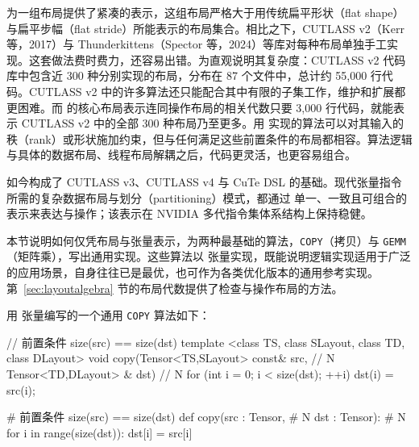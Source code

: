 \label{sec:algorithms}

\CuTe 为一组布局提供了紧凑的表示，这组布局严格大于用传统扁平形状（flat shape）与扁平步幅（flat stride）所能表示的布局集合。相比之下，CUTLASS v2（Kerr 等，2017）与 Thunderkittens（Spector 等，2024）等库对每种布局单独手工实现。这套做法费时费力，还容易出错。为直观说明其复杂度：CUTLASS v2 代码库中包含近 300 种分别实现的布局，分布在 87 个文件中，总计约 55,000 行代码。CUTLASS v2 中的许多算法还只能配合其中有限的子集工作，维护和扩展都更困难。而 \CuTe 的核心布局表示连同操作布局的相关代数只要 3,000 行代码，就能表示 CUTLASS v2 中的全部 300 种布局乃至更多。用 \CuTe 实现的算法可以对其输入的秩（rank）或形状施加约束，但与任何满足这些前置条件的布局都相容。算法逻辑与具体的数据布局、线程布局解耦之后，代码更灵活，也更容易组合。

\CuTe 如今构成了 CUTLASS v3、CUTLASS v4 与 CuTe DSL 的基础。现代张量指令所需的复杂数据布局与划分（partitioning）模式，都通过 \CuTe 单一、一致且可组合的表示来表达与操作；该表示在 NVIDIA 多代指令集体系结构上保持稳健。

本节说明如何仅凭布局与张量表示，为两种最基础的算法，{\tt COPY}（拷贝）与 {\tt GEMM}（矩阵乘），写出通用实现。这些算法以 \CuTe 张量实现，既能说明逻辑实现适用于广泛的应用场景，自身往往已是最优，也可作为各类优化版本的通用参考实现。第~\ref{sec:layoutalgebra} 节的布局代数提供了检查与操作布局的方法。

\label{sec:copy}

用 \CuTe 张量编写的一个通用 {\tt COPY} 算法如下：

\noindent
\begin{minipage}[t]{0.55\textwidth}
\begin{cpp}
// 前置条件 size(src) == size(dst)
template <class TS, class SLayout,
          class TD, class DLayout>
void
copy(Tensor<TS,SLayout> const& src,  // N
     Tensor<TD,DLayout>      & dst)  // N
{
  for (int i = 0; i < size(dst); ++i) {
    dst(i) = src(i);
  }
}
\end{cpp}
\end{minipage}
\hfill
\begin{minipage}[t]{0.40\textwidth}
\begin{python}
# 前置条件 size(src) == size(dst)
def copy(src : Tensor,   # N
         dst : Tensor):  # N
  for i in range(size(dst)):
    dst[i] = src[i]
\end{python}
\end{minipage}


